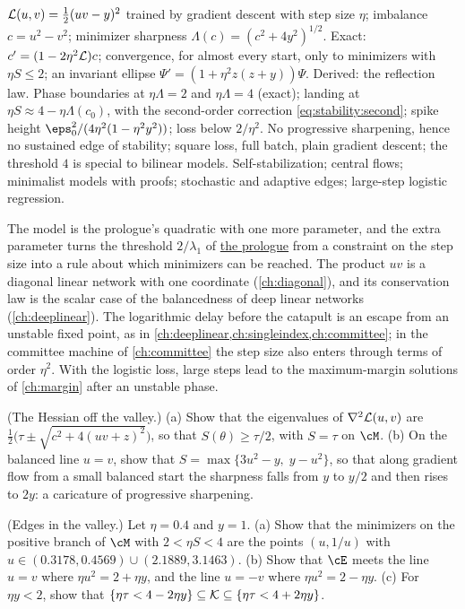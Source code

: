 \begin{refsection}
{$\mathcal{L}(u,v)=\frac12(uv-y)^2$ trained by gradient descent with step size $\eta$; imbalance $c=u^2-v^2$; minimizer sharpness $\Lambda(c)=(c^2+4y^2)^{1/2}$.}
{Exact: $c'=(1-2\eta^2\mathcal{L})c$; convergence, for almost every start, only to minimizers with $\eta S\le2$; an invariant ellipse $\Psi'=(1+\eta^2z(z+y))\Psi$. Derived: the reflection law.}
{Phase boundaries at $\eta\Lambda=2$ and $\eta\Lambda=4$ (exact); landing at $\eta S\approx4-\eta\Lambda(c_0)$, with the second-order correction \eqref{eq:stability:second}; spike height $\eps_0^2/(4\eta^2(1-\eta^2y^2))$; loss below $2/\eta^2$.}
{No progressive sharpening, hence no sustained edge of stability; square loss, full batch, plain gradient descent; the threshold $4$ is special to bilinear models.}
{Self-stabilization; central flows; minimalist models with proofs; stochastic and adaptive edges; large-step logistic regression.}

The model is the prologue's quadratic with one more parameter, and the extra parameter turns the threshold $2/\lambda_1$ of \hyperref[ch:prologue]{the prologue} from a constraint on the step size into a rule about which minimizers can be reached. The product $uv$ is a diagonal linear network with one coordinate (\cref{ch:diagonal}), and its conservation law is the scalar case of the balancedness of deep linear networks (\cref{ch:deeplinear}). The logarithmic delay before the catapult is an escape from an unstable fixed point, as in \cref{ch:deeplinear,ch:singleindex,ch:committee}; in the committee machine of \cref{ch:committee} the step size also enters through terms of order $\eta^2$. With the logistic loss, large steps lead to the maximum-margin solutions of \cref{ch:margin} after an unstable phase.

\begin{exercises}
\item \consolidation (The Hessian off the valley.) (a) Show that the eigenvalues of $\nabla^2\mathcal{L}(u,v)$ are $\frac12\bigl(\tau\pm\sqrt{c^2+4(uv+z)^2}\bigr)$, so that $S(\theta)\ge\tau/2$, with $S=\tau$ on $\cM$. (b) On the balanced line $u=v$, show that $S=\max\{3u^2-y,\;y-u^2\}$, so that along gradient flow from a small balanced start the sharpness falls from $y$ to $y/2$ and then rises to $2y$: a caricature of progressive sharpening.\label{ex:stability:hessian}

\item \consolidation (Edges in the valley.) Let $\eta=0.4$ and $y=1$. (a) Show that the minimizers on the positive branch of $\cM$ with $2<\eta S<4$ are the points $(u,1/u)$ with $u\in(0.3178,0.4569)\cup(2.1889,3.1463)$. (b) Show that $\cE$ meets the line $u=v$ where $\eta u^2=2+\eta y$, and the line $u=-v$ where $\eta u^2=2-\eta y$. (c) For $\eta y<2$, show that $\{\eta\tau<4-2\eta y\}\subseteq\mathcal{K}\subseteq\{\eta\tau<4+2\eta y\}$.\label{ex:stability:edges}


\end{exercises}
\end{refsection}

